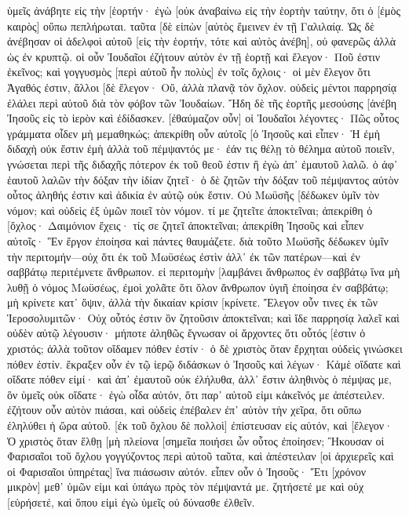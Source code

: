 ὑμεῖς ἀνάβητε εἰς τὴν [ἑορτήν· ἐγὼ [οὐκ ἀναβαίνω εἰς τὴν ἑορτὴν ταύτην, ὅτι ὁ [ἐμὸς καιρὸς] οὔπω πεπλήρωται. 
ταῦτα [δὲ εἰπὼν [αὐτὸς ἔμεινεν ἐν τῇ Γαλιλαίᾳ. 
Ὡς δὲ ἀνέβησαν οἱ ἀδελφοὶ αὐτοῦ [εἰς τὴν ἑορτήν, τότε καὶ αὐτὸς ἀνέβη], οὐ φανερῶς ἀλλὰ ὡς ἐν κρυπτῷ. 
οἱ οὖν Ἰουδαῖοι ἐζήτουν αὐτὸν ἐν τῇ ἑορτῇ καὶ ἔλεγον· Ποῦ ἐστιν ἐκεῖνος; 
καὶ γογγυσμὸς [περὶ αὐτοῦ ἦν πολὺς] ἐν τοῖς ὄχλοις· οἱ μὲν ἔλεγον ὅτι Ἀγαθός ἐστιν, ἄλλοι [δὲ ἔλεγον· Οὔ, ἀλλὰ πλανᾷ τὸν ὄχλον. 
οὐδεὶς μέντοι παρρησίᾳ ἐλάλει περὶ αὐτοῦ διὰ τὸν φόβον τῶν Ἰουδαίων. 
Ἤδη δὲ τῆς ἑορτῆς μεσούσης [ἀνέβη Ἰησοῦς εἰς τὸ ἱερὸν καὶ ἐδίδασκεν. 
[ἐθαύμαζον οὖν] οἱ Ἰουδαῖοι λέγοντες· Πῶς οὗτος γράμματα οἶδεν μὴ μεμαθηκώς; 
ἀπεκρίθη οὖν αὐτοῖς [ὁ Ἰησοῦς καὶ εἶπεν· Ἡ ἐμὴ διδαχὴ οὐκ ἔστιν ἐμὴ ἀλλὰ τοῦ πέμψαντός με· 
ἐάν τις θέλῃ τὸ θέλημα αὐτοῦ ποιεῖν, γνώσεται περὶ τῆς διδαχῆς πότερον ἐκ τοῦ θεοῦ ἐστιν ἢ ἐγὼ ἀπ᾽ ἐμαυτοῦ λαλῶ. 
ὁ ἀφ᾽ ἑαυτοῦ λαλῶν τὴν δόξαν τὴν ἰδίαν ζητεῖ· ὁ δὲ ζητῶν τὴν δόξαν τοῦ πέμψαντος αὐτὸν οὗτος ἀληθής ἐστιν καὶ ἀδικία ἐν αὐτῷ οὐκ ἔστιν. 
Οὐ Μωϋσῆς [δέδωκεν ὑμῖν τὸν νόμον; καὶ οὐδεὶς ἐξ ὑμῶν ποιεῖ τὸν νόμον. τί με ζητεῖτε ἀποκτεῖναι; 
ἀπεκρίθη ὁ [ὄχλος· Δαιμόνιον ἔχεις· τίς σε ζητεῖ ἀποκτεῖναι; 
ἀπεκρίθη Ἰησοῦς καὶ εἶπεν αὐτοῖς· Ἓν ἔργον ἐποίησα καὶ πάντες θαυμάζετε. 
διὰ τοῦτο Μωϋσῆς δέδωκεν ὑμῖν τὴν περιτομήν—οὐχ ὅτι ἐκ τοῦ Μωϋσέως ἐστὶν ἀλλ᾽ ἐκ τῶν πατέρων—καὶ ἐν σαββάτῳ περιτέμνετε ἄνθρωπον. 
εἰ περιτομὴν [λαμβάνει ἄνθρωπος ἐν σαββάτῳ ἵνα μὴ λυθῇ ὁ νόμος Μωϋσέως, ἐμοὶ χολᾶτε ὅτι ὅλον ἄνθρωπον ὑγιῆ ἐποίησα ἐν σαββάτῳ; 
μὴ κρίνετε κατ᾽ ὄψιν, ἀλλὰ τὴν δικαίαν κρίσιν [κρίνετε. 
Ἔλεγον οὖν τινες ἐκ τῶν Ἱεροσολυμιτῶν· Οὐχ οὗτός ἐστιν ὃν ζητοῦσιν ἀποκτεῖναι; 
καὶ ἴδε παρρησίᾳ λαλεῖ καὶ οὐδὲν αὐτῷ λέγουσιν· μήποτε ἀληθῶς ἔγνωσαν οἱ ἄρχοντες ὅτι οὗτός [ἐστιν ὁ χριστός; 
ἀλλὰ τοῦτον οἴδαμεν πόθεν ἐστίν· ὁ δὲ χριστὸς ὅταν ἔρχηται οὐδεὶς γινώσκει πόθεν ἐστίν. 
ἔκραξεν οὖν ἐν τῷ ἱερῷ διδάσκων ὁ Ἰησοῦς καὶ λέγων· Κἀμὲ οἴδατε καὶ οἴδατε πόθεν εἰμί· καὶ ἀπ᾽ ἐμαυτοῦ οὐκ ἐλήλυθα, ἀλλ᾽ ἔστιν ἀληθινὸς ὁ πέμψας με, ὃν ὑμεῖς οὐκ οἴδατε· 
ἐγὼ οἶδα αὐτόν, ὅτι παρ᾽ αὐτοῦ εἰμι κἀκεῖνός με ἀπέστειλεν. 
ἐζήτουν οὖν αὐτὸν πιάσαι, καὶ οὐδεὶς ἐπέβαλεν ἐπ᾽ αὐτὸν τὴν χεῖρα, ὅτι οὔπω ἐληλύθει ἡ ὥρα αὐτοῦ. 
[ἐκ τοῦ ὄχλου δὲ πολλοὶ] ἐπίστευσαν εἰς αὐτόν, καὶ [ἔλεγον· Ὁ χριστὸς ὅταν ἔλθῃ [μὴ πλείονα [σημεῖα ποιήσει ὧν οὗτος ἐποίησεν; 
Ἤκουσαν οἱ Φαρισαῖοι τοῦ ὄχλου γογγύζοντος περὶ αὐτοῦ ταῦτα, καὶ ἀπέστειλαν [οἱ ἀρχιερεῖς καὶ οἱ Φαρισαῖοι ὑπηρέτας] ἵνα πιάσωσιν αὐτόν. 
εἶπεν οὖν ὁ Ἰησοῦς· Ἔτι [χρόνον μικρὸν] μεθ᾽ ὑμῶν εἰμι καὶ ὑπάγω πρὸς τὸν πέμψαντά με. 
ζητήσετέ με καὶ οὐχ [εὑρήσετέ, καὶ ὅπου εἰμὶ ἐγὼ ὑμεῖς οὐ δύνασθε ἐλθεῖν. 
